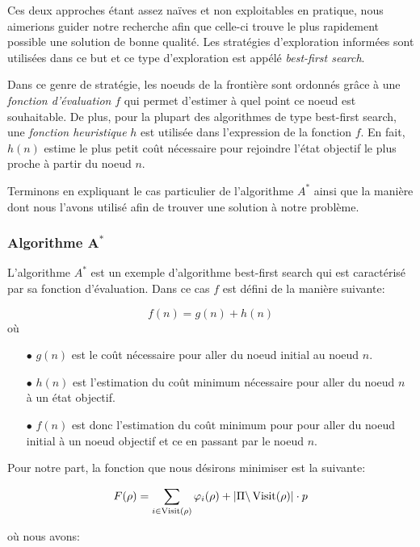 Ces deux approches étant assez naïves et non exploitables en pratique, nous aimerions guider notre recherche afin que celle-ci trouve le plus rapidement possible une solution de bonne qualité. Les stratégies d'exploration informées sont utilisées dans ce but et ce type d'exploration est appélé \emph{best-first search}.

Dans ce genre de stratégie, les noeuds de la frontière sont ordonnés grâce à une \emph{fonction d'évaluation} $f$ qui permet d'estimer à quel point ce noeud est souhaitable. De plus, pour la plupart des algorithmes de type best-first search, une \emph{fonction heuristique} $h$ est utilisée dans l'expression de la fonction $f$. En fait, $h(n)$ estime le plus petit coût nécessaire pour rejoindre l'état objectif le plus proche à partir du noeud $n$.

Terminons en expliquant le cas particulier de l'algorithme $A^*$ ainsi que la manière dont nous l'avons utilisé afin de trouver une solution à notre problème.

\subsubsection{Algorithme $\mathbf{A^*}$}
\label{subsubsection:aStar}

L'algorithme $A^*$ est un exemple d'algorithme best-first search qui est caractérisé par sa fonction d'évaluation. Dans ce cas $f$ est défini de la manière suivante:

$$f(n) = g(n) + h(n)$$
où 
\begin{itemize}
	\item[$\bullet$] $g(n)$ est le coût nécessaire pour aller du noeud initial au noeud $n$.
	\item[$\bullet$] $h(n)$ est l'estimation du coût minimum nécessaire pour aller du noeud $n$ à un état objectif.
	\item[$\bullet$] $f(n)$ est donc l'estimation du coût minimum pour pour aller du noeud initial à un noeud objectif et ce en passant par le noeud $n$.
\end{itemize}

Pour notre part, la fonction que nous désirons minimiser est la suivante:

$$ F(\rho) = \sum_{i \in \operatorname*{Visit}(\rho)} \varphi_i(\rho) + |\Pi \backslash \operatorname*{Visit}(\rho)| \cdot p$$

où nous avons:

